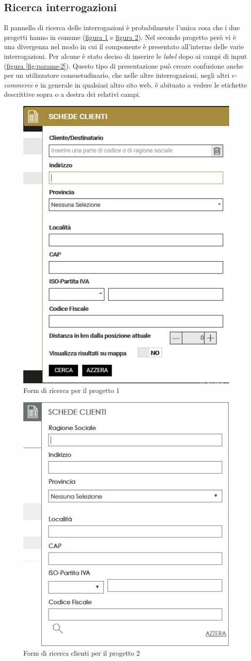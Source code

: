 \subsection{Ricerca interrogazioni}
Il pannello di ricerca delle interrogazioni è probabilmente l'unica cosa che i due progetti hanno in comune (\hyperref[fig:params-1]{figura \ref{fig:params-1}} e \hyperref[fig:clienti-params-2]{figura \ref{fig:clienti-params-2}}). Nel secondo progetto però vi è una divergenza nel modo in cui il componente è presentato all'interno delle varie interrogazioni. Per alcune è stato deciso di inserire le \textit{label} dopo ai campi di input (\hyperref[fig:params-2]{figura \ref{fig:params-2}}). Questo tipo di presentazione può creare confusione anche per un utilizzatore consuetudinario, che nelle altre interrogazioni, negli altri \textit{e-commerce} e in generale in qualsiasi altro sito web, è abituato a vedere le etichette descrittive sopra o a destra dei relativi campi.
\begin{figure}[H]
	\centering
	\includegraphics[height=0.8\linewidth]{Immagini/p1/params.png}
	\caption{Form di ricerca per il progetto 1}
	\label{fig:params-1}
\end{figure}
\begin{figure}[H]
	\centering
	\includegraphics[height=0.7\linewidth]{Immagini/p2/clienti-params.png}
	\caption{Form di ricerca clienti per il progetto 2}
	\label{fig:clienti-params-2}
\end{figure}
